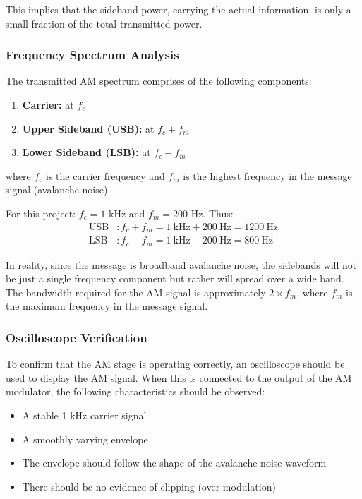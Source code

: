 \documentclass[12pt,a4paper]{report}
\begin{document}
	This implies that the sideband power, carrying the actual information, is only a small fraction of the total transmitted power.
	\subsubsection{Frequency Spectrum Analysis}
	The transmitted AM spectrum comprises of the following components:
	\begin{enumerate}
		\item \textbf{Carrier:} at $f_c$
		\item \textbf{Upper Sideband (USB):} at $f_c + f_m$
		\item \textbf{Lower Sideband (LSB):} at $f_c - f_m$
	\end{enumerate}
	where $f_c$ is the carrier frequency and $f_m$ is the highest frequency in the message signal (avalanche noise).
	
	For this project: $f_c = 1$ kHz and $f_m = 200$ Hz. Thus:
	\begin{align*}
		\text{USB} &: f_c + f_m = 1\ \text{kHz} + 200\ \text{Hz} = 1200\ \text{Hz} \\
		\text{LSB} &: f_c - f_m = 1\ \text{kHz} - 200\ \text{Hz} = 800\ \text{Hz}
	\end{align*}
	
	In reality, since the message is broadband avalanche noise, the sidebands will not be just a single frequency component but rather will spread over a wide band. The bandwidth required for the AM signal is approximately $2 \times f_m$, where $f_m$ is the maximum frequency in the message signal.
	\subsubsection{Oscilloscope Verification}
	To confirm that the AM stage is operating correctly, an oscilloscope should be used to display the AM signal. When this is connected to the output of the AM modulator, the following characteristics should be observed:
	\begin{itemize}
		\item A stable 1 kHz carrier signal
		\item A smoothly varying envelope
		\item The envelope should follow the shape of the avalanche noise waveform
		\item There should be no evidence of clipping (over-modulation)
	\end{itemize}
	
\end{document}
